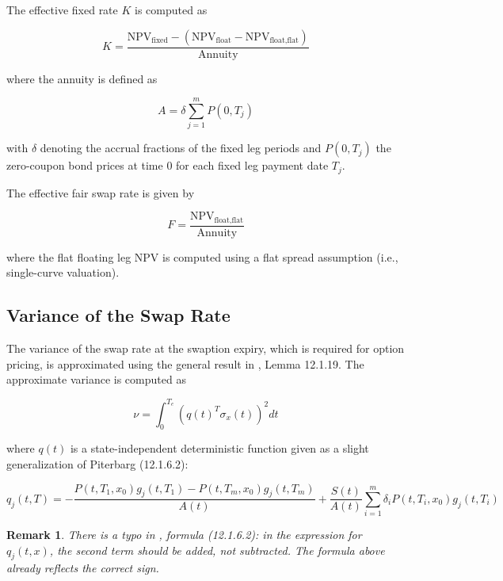 \documentclass{amsart}
\theoremstyle{plain}
\newtheorem{remark}{Remark}
\numberwithin{equation}{section}
\begin{document}
The effective fixed rate $K$ is computed as

\begin{equation}
K = \frac{\text{NPV}_{\text{fixed}} - (\text{NPV}_{\text{float}} - \text{NPV}_{\text{float,flat}})}{\text{Annuity}}
\end{equation}

where the annuity is defined as

\begin{equation}
A = \delta \sum_{j=1}^{m} P(0, T_j)
\end{equation}

with $\delta$ denoting the accrual fractions of the fixed leg periods and $P(0, T_j)$ the zero-coupon bond prices at
time $0$ for each fixed leg payment date $T_j$.

The effective fair swap rate is given by

\begin{equation}
F = \frac{\text{NPV}_{\text{float,flat}}}{\text{Annuity}}
\end{equation}

where the flat floating leg NPV is computed using a flat spread assumption (i.e., single-curve valuation).

\subsection{Variance of the Swap Rate}

The variance of the swap rate at the swaption expiry, which is required for option pricing, is approximated using the
general result in \cite{Andersen_Piterbarg_2010}, Lemma 12.1.19. The approximate variance is computed as

\begin{equation}
\nu = \int_0^{T_e} (q(t)^T \sigma_x(t))^2 dt
\end{equation}

where $q(t)$ is a state-independent deterministic function given as a slight generalization of Piterbarg (12.1.6.2):

\begin{equation}
q_j(t,T) = -\frac{P(t,T_1,x_0) g_j(t,T_1) - P(t,T_m,x_0) g_j(t,T_m)}{A(t)} + \frac{S(t)}{A(t)} \sum_{i=1}^m \delta_i P(t,T_i,x_0) g_j(t,T_i)
\end{equation}

\begin{remark}
There is a typo in \cite{Andersen_Piterbarg_2010}, formula (12.1.6.2): in the expression for $q_j(t,x)$, the second
term should be added, not subtracted. The formula above already reflects the correct sign.
\end{remark}
\end{document}
